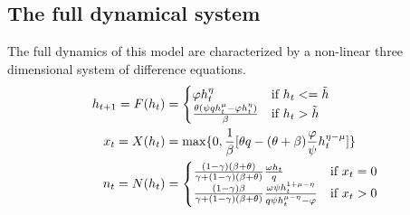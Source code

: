 \subsection{The full dynamical system} 
The full dynamics of this model are characterized by a non-linear three dimensional system of difference equations.
        \begin{equation}
    \begin{aligned}
    h_{t+1} = F(h_t)  &= \begin{cases}
                    \varphi h_{t}^{\eta}  & \text{if } h_t <= \Tilde{h} \\
                     \frac{\theta (\psi q h_{t}^{\mu} - \varphi h_{t}^{\eta})}{\beta}  & \text{if } h_t > \Tilde{h}
                     \end{cases}\\
    x_t = X(h_t)  &= \max \{0, \frac{1}{\beta}[\theta q - (\theta + \beta) \frac{\varphi}{\psi}  h_t^{\eta - \mu}]\} \\
    n_t = N(h_t)  &= \begin{cases}
                \frac{(1-\gamma)(\beta + \theta)}{\gamma + (1-\gamma)(\beta + \theta)} \frac{\omega h_t}{q} & \text{if } x_t = 0 \\
                \frac{(1-\gamma)\beta}{\gamma + (1-\gamma)(\beta + \theta)} \frac{\omega \psi h_t^{1 + \mu - \eta }}{q \psi h_t^{\mu - \eta} - \varphi}   & \text{if } x_t > 0
                 \end{cases}
    \end{aligned}
    \end{equation}



